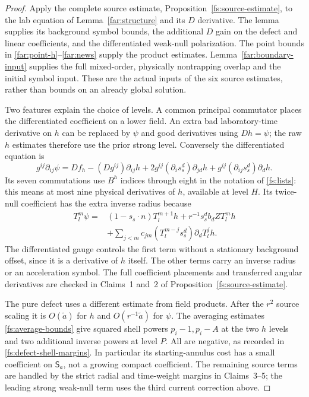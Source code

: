\begin{proof}
Apply the complete source estimate, Proposition~\ref{fs:source-estimate},
to the lab equation of Lemma~\ref{far:structure} and its $D$ derivative.
The lemma supplies its background symbol bounds, the additional $D$
gain on the defect and linear coefficients, and the differentiated
weak-null polarization.  The point bounds in
\eqref{far:point-h}--\eqref{far:news} supply the product estimates.
Lemma~\ref{far:boundary-input} supplies the full mixed-order,
physically nontrapping overlap and the initial symbol input.
These are the actual inputs of the six source estimates, rather than
bounds on an already global solution.

Two features explain the choice of levels.  A common principal
commutator places the differentiated coefficient on a lower field.
An extra bad laboratory-time derivative on $h$ can be replaced by
$\psi$ and good derivatives using $Dh=\psi$; the raw $h$ estimates
therefore use the prior strong level.  Conversely the differentiated equation is
\begin{equation}\label{far:strong-equation}
 g^{ij}\partial_{ij}\psi
   =Df_h-(Dg^{ij})\partial_{ij}h
      +2g^{ij}(\partial_is_s^d)\partial_{jd}h
      +g^{ij}(\partial_{ij}s_s^d)\partial_dh.
\end{equation}
Its seven commutations use $B^h$ indices through eight in the notation of
\eqref{fs:lists}: this means at most nine physical derivatives of $h$,
available at level $H$.  Its twice-null coefficient has the extra inverse radius because
\begin{equation}\label{far:strong-projection-identity}
 \begin{split}
 T_l^m\psi={}&(1-s_s\cdot n)T_l^{m+1}h
       +r^{-1}s_s^db_dZT_l^mh\\
 &+\sum_{j<m}c_{jm}(T_l^{m-j}s_s^d)\partial_dT_l^jh.
 \end{split}
\end{equation}
The differentiated gauge controls the first term without a stationary
background offset, since it is a derivative of $h$ itself.  The other
terms carry an inverse radius or an acceleration symbol.  The full
coefficient placements and transferred angular derivatives are checked
in Claims~1 and~2 of Proposition~\ref{fs:source-estimate}.

The pure defect uses a different estimate from field products.
After the $r^2$ source scaling it is $O(\widetilde a)$ for $h$
and $O(r^{-1}\widetilde a)$ for $\psi$.
The averaging estimates \eqref{fs:average-bounds} give squared shell
powers $p_i-1,p_i-A$ at the two $h$ levels and two additional inverse
powers at level $P$.  All are negative, as recorded in
\eqref{fs:defect-shell-margins}.  In particular its starting-annulus
cost has a small coefficient on $\mathsf S_a$, not a growing compact
coefficient.  The remaining source terms are handled by the strict
radial and time-weight margins in Claims~3--5; the leading strong
weak-null term uses the third current correction above.


\end{proof}
